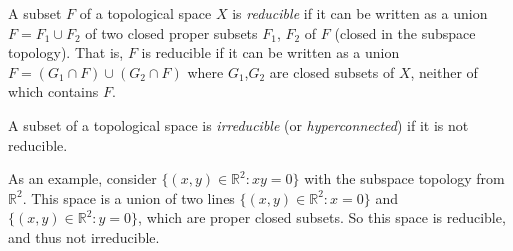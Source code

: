 \documentclass{article}
\begin{document}
A subset $F$ of a topological space $X$ is {\em reducible} if it can be written as a union $F = F_1 \cup F_2$ of two closed proper subsets $F_1$, $F_2$ of $F$ (closed in the subspace topology).  That is, $F$ is reducible if it can be written as a union $F = (G_1\cap F)\cup(G_2\cap F)$ where $G_1$,$G_2$ are closed subsets of $X$, neither of which contains $F$.

A subset of a topological space is {\em irreducible} (or \emph{hyperconnected}) if it is not reducible.

As an example, consider $\{ (x,y)\in\mathbb{R}^2 : xy = 0 \}$ with the subspace topology from $\mathbb{R}^2$.  This space is a union of two lines $\{ (x,y)\in\mathbb{R}^2 : x = 0 \}$ and $\{ (x,y)\in\mathbb{R}^2 : y = 0 \}$, which are proper closed subsets.  So this space is reducible, and thus not irreducible.
\end{document}
